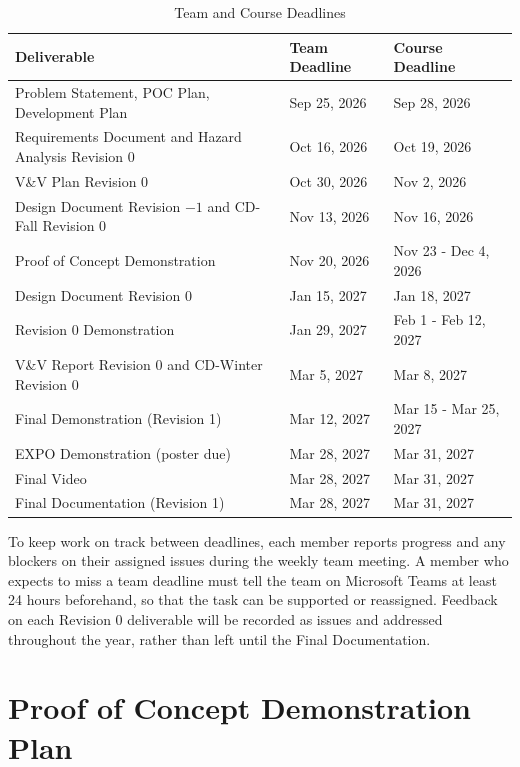 \documentclass{article}
\begin{document}
\begin{table}[H]
  \caption{Team and Course Deadlines} \label{TblSchedule}
  \begin{tabularx}{\textwidth}{>{\raggedright\arraybackslash}Xll}
    \toprule
    \textbf{Deliverable} & \textbf{Team Deadline} & \textbf{Course Deadline}\\
    \midrule
      Problem Statement, POC Plan, Development Plan & Sep 25, 2026 & Sep 28, 2026\\
      Requirements Document and Hazard Analysis Revision 0 & Oct 16, 2026 & Oct 19, 2026\\
      V\&V Plan Revision 0 & Oct 30, 2026 & Nov 2, 2026\\
      Design Document Revision $-1$ and CD-Fall Revision 0 & Nov 13, 2026 & Nov 16, 2026\\
      Proof of Concept Demonstration & Nov 20, 2026 & Nov 23 - Dec 4, 2026\\
      Design Document Revision 0 & Jan 15, 2027 & Jan 18, 2027\\
      Revision 0 Demonstration & Jan 29, 2027 & Feb 1 - Feb 12, 2027\\
      V\&V Report Revision 0 and CD-Winter Revision 0 & Mar 5, 2027 & Mar 8, 2027\\
      Final Demonstration (Revision 1) & Mar 12, 2027 & Mar 15 - Mar 25, 2027\\
      EXPO Demonstration (poster due) & Mar 28, 2027 & Mar 31, 2027\\
      Final Video & Mar 28, 2027 & Mar 31, 2027\\
      Final Documentation (Revision 1) & Mar 28, 2027 & Mar 31, 2027\\
    \bottomrule
  \end{tabularx}
\end{table}


To keep work on track between deadlines, each member reports progress and any blockers on their assigned issues during the weekly team meeting. 
A member who expects to miss a team deadline must tell the team on Microsoft Teams at least 24 hours beforehand, so that the task can be supported or reassigned. 
Feedback on each Revision 0 deliverable will be recorded as issues and addressed throughout the year, rather than left until the Final Documentation.


\section{Proof of Concept Demonstration Plan}
\end{document}
